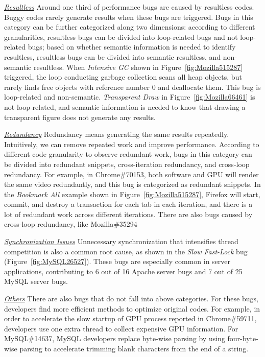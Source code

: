\underline{\it Resultless} 
Around one third of performance bugs are caused by resultless codes. 
Buggy codes rarely generate results when these bugs are triggered.
Bugs in this category can be further categorized along two dimensions: 
according to different granularities, 
resultless bugs can be divided into loop-related bugs and not loop-related bugs; 
based on whether semantic information is needed to identify resultless, 
resultless bugs can be divided into semantic resultless, and non-semantic resultless.
When {\it Intensive GC} shown in Figure~\ref{fig:Mozilla515287} triggered, 
the loop conducting garbage collection scans all heap objects, 
but rarely finds free objects with reference number 0 and deallocate them. 
This bug is loop-related and non-semantic.  
{\it Transparent Draw} in Figure~\ref{fig:Mozilla66461} is not loop-related, 
and semantic information is needed to know that drawing a transparent figure does not generate any results.

\underline{\it Redundancy} 
Redundancy means generating the same results repeatedly. 
Intuitively, we can remove repeated work and improve performance. 
According to different code granularity to observe redundant work, 
bugs in this category can be divided into redundant snippets, 
cross-iteration redundancy, and cross-loop redundancy.  
For example, in Chrome\#70153, 
both software and GPU will render the same video redundantly, 
and this bug is categorized as redundant snippets. 
In the {\it Bookmark All} example shown in Figure~\ref{fig:Mozilla515287}, 
Firefox will start, commit, and destroy a transaction for each tab in each iteration, 
and there is a lot of redundant work across different iterations. 
There are also bugs caused by cross-loop redundancy, like Mozilla\#35294

\underline{\it Synchronization Issues}
Unnecessary synchronization that intensifies thread competition 
is also a common root cause, as shown in the {\it Slow Fast-Lock} 
bug (Figure~\ref{fig:MySQL26527}). 
These bugs are especially common in server applications, 
contributing to 6 out of 16 Apache server bugs and 7 out of 25 MySQL server bugs.

\underline{\it Others}
There are also bugs that do not fall into above categories. 
For these bugs, developers find more efficient methods to optimize original codes.
For example, in order to accelerate the slow startup of GPU process reported in Chrome\#59711, 
developers use one extra thread to collect expensive GPU information. 
For MySQL\#14637, MySQL developers replace byte-wise parsing by using four-byte-wise parsing 
to accelerate trimming blank characters from the end of a string. 
